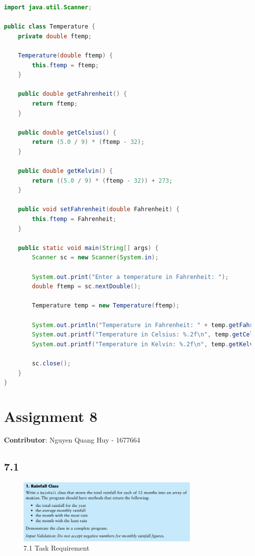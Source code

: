 \documentclass{article}
\begin{document}
\begin{lstlisting}[language=Java, caption=Temperature Class]
import java.util.Scanner;

public class Temperature {
    private double ftemp;

    Temperature(double ftemp) {
        this.ftemp = ftemp;
    }

    public double getFahrenheit() {
        return ftemp;
    }

    public double getCelsius() {
        return (5.0 / 9) * (ftemp - 32);
    }

    public double getKelvin() {
        return ((5.0 / 9) * (ftemp - 32)) + 273;
    }

    public void setFahrenheit(double Fahrenheit) {
        this.ftemp = Fahrenheit;
    }

    public static void main(String[] args) {
        Scanner sc = new Scanner(System.in);

        System.out.print("Enter a temperature in Fahrenheit: ");
        double ftemp = sc.nextDouble();

        Temperature temp = new Temperature(ftemp);

        System.out.println("Temperature in Fahrenheit: " + temp.getFahrenheit());
        System.out.printf("Temperature in Celsius: %.2f\n", temp.getCelsius());
        System.out.printf("Temperature in Kelvin: %.2f\n", temp.getKelvin());

        sc.close();
    }
}
\end{lstlisting}

\section*{Assignment 8}

\textbf{Contributor}: Nguyen Quang Huy - 1677664

\subsection*{7.1}

\begin{figure}[H]
    \centering
    \includegraphics[width=0.8\textwidth]{./Assets/Task requirements/Assignment8/7.1.png}
    \caption{7.1 Task Requirement}
\end{figure}
\end{document}
